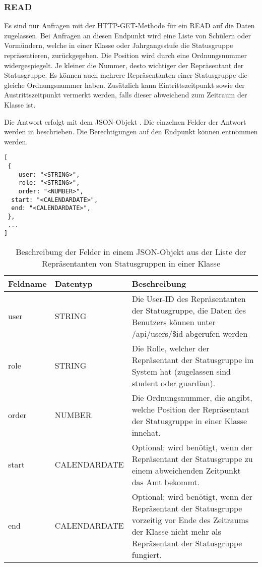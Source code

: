\subsubsection{READ}
\label{sec:rest:api:classes:id:representatives:read}
Es sind nur Anfragen mit der HTTP-GET-Methode für ein READ auf die Daten zugelassen.
Bei Anfragen an diesen Endpunkt wird eine Liste von Schülern oder Vormündern, welche in einer Klasse oder Jahrgangsstufe die Statusgruppe repräsentieren, zurückgegeben.
Die Position wird durch eine Ordnungsnummer widergespiegelt. Je kleiner die Nummer, desto wichtiger der Repräsentant der Statusgruppe.
Es können auch mehrere Repräsentanten einer Statusgruppe die gleiche Ordnungsnummer haben.
Zusätzlich kann Eintrittszeitpunkt sowie der Austrittszeitpunkt vermerkt werden, falls dieser abweichend zum Zeitraum der Klasse ist.

Die Antwort erfolgt mit dem JSON-Objekt . 
Die einzelnen Felder der Antwort werden in  beschrieben.
Die Berechtigungen auf den Endpunkt können  entnommen werden.

\begin{lstlisting}[caption={JSON-Antwort für einen GET-Aufruf der Route /api/classes/\$id/representatives},label={lst:code:rest:api:classes:id:representatives:read:ret},frame=tlrb]
[ 
 { 
	user: "<STRING>",
	role: "<STRING>",
	order: "<NUMBER>",
  start: "<CALENDARDATE>",
  end: "<CALENDARDATE>",
 },
 ... 
]
\end{lstlisting}

\begin{longtable}{|p{}|p{}|p{}|}
		\caption{Beschreibung der Felder in einem JSON-Objekt aus der Liste der Repräsentanten von Statusgruppen in einer Klasse}
\endfoot
		\caption{Beschreibung der Felder in einem JSON-Objekt aus der Liste der Repräsentanten von Statusgruppen in einer Klasse}
		\label{tab:rest:api:classes:id:representatives:read:ret}
\endlastfoot 
\hline
			\textbf{Feldname} & \textbf{Datentyp} & \textbf{Beschreibung} \\ \hline
\endhead
user & STRING & Die User-ID des Repräsentanten der Statusgruppe, die Daten des Benutzers können unter /api/users/\$id abgerufen werden \\ \hline
role & STRING & Die Rolle, welcher der Repräsentant der Statusgruppe im System hat (zugelassen sind student oder guardian). \\ \hline
order & NUMBER & Die Ordnungsnummer, die angibt, welche Position der Repräsentant der Statusgruppe in einer Klasse innehat. \\ \hline
start & CALENDARDATE & Optional; wird benötigt, wenn der Repräsentant der Statusgruppe zu einem abweichenden Zeitpunkt das Amt bekommt. \\ \hline
end & CALENDARDATE & Optional; wird benötigt, wenn der Repräsentant der Statusgruppe vorzeitig vor Ende des Zeitraums der Klasse nicht mehr als Repräsentant der Statusgruppe fungiert. \\ \hline
\end{longtable}